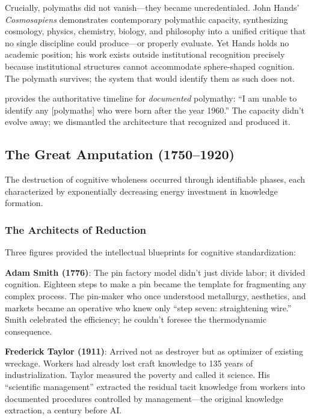 Crucially, polymaths did not vanish---they became uncredentialed. John Hands' \textit{Cosmosapiens} \citeyearpar{hands2015} demonstrates contemporary polymathic capacity, synthesizing cosmology, physics, chemistry, biology, and philosophy into a unified critique that no single discipline could produce---or properly evaluate. Yet Hands holds no academic position; his work exists outside institutional recognition precisely because institutional structures cannot accommodate sphere-shaped cognition. The polymath survives; the system that would identify them as such does not.

\citet{burke2020} provides the authoritative timeline for \textit{documented} polymathy: ``I am unable to identify any [polymaths] who were born after the year 1960.'' The capacity didn't evolve away; we dismantled the architecture that recognized and produced it.

\subsection{The Great Amputation (1750--1920)}

The destruction of cognitive wholeness occurred through identifiable phases, each characterized by exponentially decreasing energy investment in knowledge formation.

\subsubsection{The Architects of Reduction}

Three figures provided the intellectual blueprints for cognitive standardization:

\textbf{Adam Smith (1776)}: The pin factory model didn't just divide labor; it divided cognition. Eighteen steps to make a pin became the template for fragmenting any complex process. The pin-maker who once understood metallurgy, aesthetics, and markets became an operative who knew only ``step seven: straightening wire.'' Smith celebrated the efficiency; he couldn't foresee the thermodynamic consequence.

\textbf{Frederick Taylor (1911)}: Arrived not as destroyer but as optimizer of existing wreckage. Workers had already lost craft knowledge to 135 years of industrialization. Taylor measured the poverty and called it science. His ``scientific management'' extracted the residual tacit knowledge from workers into documented procedures controlled by management---the original knowledge extraction, a century before AI.

